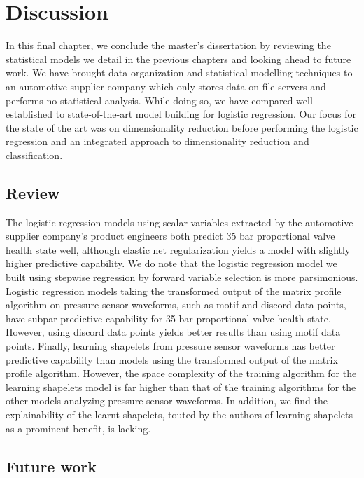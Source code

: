\chapter{Discussion}

In this final chapter, we conclude the master's dissertation by reviewing the statistical models we detail in the previous chapters and looking ahead to future work.
We have brought data organization and statistical modelling techniques to an automotive supplier company which only stores data on file servers and performs no statistical analysis.
While doing so, we have compared well established to state-of-the-art model building for logistic regression.
Our focus for the state of the art was on dimensionality reduction before performing the logistic regression and an integrated approach to dimensionality reduction and classification.

\section{Review}

The logistic regression models using scalar variables extracted by the automotive supplier company's product engineers both predict 35 bar proportional valve health state well, although elastic net regularization yields a model with slightly higher predictive capability.
We do note that the logistic regression model we built using stepwise regression by forward variable selection is more parsimonious.
Logistic regression models taking the transformed output of the matrix profile algorithm on pressure sensor waveforms, such as motif and discord data points, have subpar predictive capability for 35 bar proportional valve health state.
However, using discord data points yields better results than using motif data points.
Finally, learning shapelets from pressure sensor waveforms has better predictive capability than models using the transformed output of the matrix profile algorithm.
However, the space complexity of the training algorithm for the learning shapelets model is far higher than that of the training algorithms for the other models analyzing pressure sensor waveforms.
In addition, we find the explainability of the learnt shapelets, touted by the authors of learning shapelets as a prominent benefit, is lacking.

\section{Future work}

